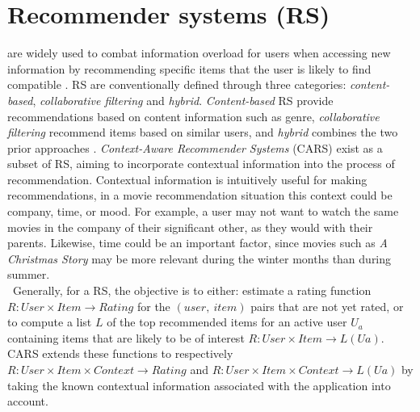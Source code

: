 \chapter{Recommender systems (RS)}\label{ch:introduction}
are widely used to combat information overload for users when accessing new information by recommending specific items that the user is likely to find compatible \cite{YouTubeNeural,IndustryPerspective}.
RS are conventionally defined through three categories: \textit{content-based}, \textit{collaborative filtering} and \textit{hybrid}.
\textit{Content-based} RS provide recommendations based on content information such as genre, \textit{collaborative filtering} recommend items based on similar users, and \textit{hybrid} combines the two prior approaches \cite{ContextSurvey2020}.
\textit{Context-Aware Recommender Systems} (CARS) exist as a subset of RS, aiming to incorporate contextual information into the process of recommendation.
Contextual information is intuitively useful for making recommendations, in a movie recommendation situation this context could be company, time, or mood.
For example, a user may not want to watch the same movies in the company of their significant other, as they would with their parents.
Likewise, time could be an important factor, since movies such as \textit{A Christmas Story} may be more relevant during the winter months than during summer.\\\
Generally, for a RS, the objective is to either: estimate a rating function $R: User \times Item \rightarrow Rating$ for the $(user, \ item)$ pairs that are not yet rated, or to compute a list $L$ of the top recommended items for an active user $U_a$ containing items that are likely to be of interest $R: User \times Item \rightarrow L(Ua)$\cite{RecommenderHandbook2015}.
CARS extends these functions to respectively $R: User \times Item \times Context \rightarrow Rating$ and $R: User \times Item \times Context \rightarrow L(Ua)$ by taking the known contextual information associated with the application into account.
